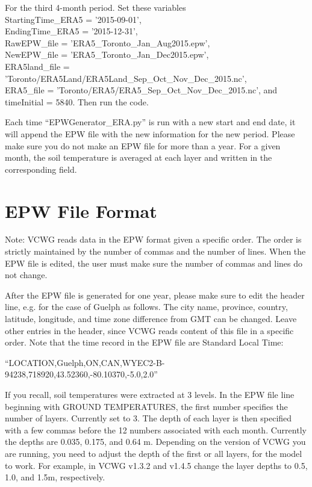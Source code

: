 \documentclass[12pt]{article}
\begin{document}
For the third 4-month period. Set these variables \\
StartingTime\_ERA5 = '2015-09-01', \\
EndingTime\_ERA5 = '2015-12-31', \\
RawEPW\_file = 'ERA5\_Toronto\_Jan\_Aug2015.epw', \\
NewEPW\_file = 'ERA5\_Toronto\_Jan\_Dec2015.epw', \\ 
ERA5land\_file = 'Toronto/ERA5Land/ERA5Land\_Sep\_Oct\_Nov\_Dec\_2015.nc', \\ 
ERA5\_file = 'Toronto/ERA5/ERA5\_Sep\_Oct\_Nov\_Dec\_2015.nc', and \\
timeInitial = 5840. Then run the code.

Each time ``EPWGenerator\_ERA.py'' is run with a new start and end date, it will append the EPW file with the new information for the new period. Please make sure you do not make an EPW file for more than a year. For a given month, the soil temperature is averaged at each layer and written in the corresponding field. 

\section{EPW File Format} 

Note: VCWG reads data in the EPW format given a specific order. The order is strictly maintained by the number of commas and the number of lines. When the EPW file is edited, the user must make sure the number of commas and lines do not change.

After the EPW file is generated for one year, please make sure to edit the header line, e.g. for the case of Guelph as follows. The city name, province, country, latitude, longitude, and time zone difference from GMT can be changed. Leave other entries in the header, since VCWG reads content of this file in a specific order. Note that the time record in the EPW file are Standard Local Time:

``LOCATION,Guelph,ON,CAN,WYEC2-B-94238,718920,43.52360,-80.10370,-5.0,2.0''

If you recall, soil temperatures were extracted at 3 levels. In the EPW file line beginning with GROUND TEMPERATURES, the first number specifies the number of layers. Currently set to 3. The depth of each layer is then specified with a few commas before the 12 numbers associated with each month. Currently the depths are 0.035, 0.175, and 0.64 m. Depending on the version of VCWG you are running, you need to adjust the depth of the first or all layers, for the model to work. For example, in VCWG v1.3.2 and v1.4.5 change the layer depths to 0.5, 1.0, and 1.5m, respectively. 
\end{document}

